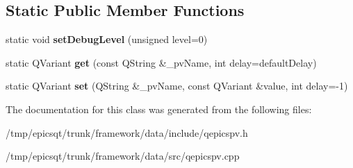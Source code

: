\subsection*{Static Public Member Functions}
\begin{DoxyCompactItemize}
\item 
\hypertarget{classQEpicsPV_af1bb5941b878ddc44b4fcb1c6b4466ff}{
static void {\bfseries setDebugLevel} (unsigned level=0)}
\label{classQEpicsPV_af1bb5941b878ddc44b4fcb1c6b4466ff}

\item 
\hypertarget{classQEpicsPV_a87c7e674fc5981adea30a32b86daec14}{
static QVariant {\bfseries get} (const QString \&\_\-pvName, int delay=defaultDelay)}
\label{classQEpicsPV_a87c7e674fc5981adea30a32b86daec14}

\item 
\hypertarget{classQEpicsPV_a704fcfcd602515d0d8ce678635b2e532}{
static QVariant {\bfseries set} (QString \&\_\-pvName, const QVariant \&value, int delay=-\/1)}
\label{classQEpicsPV_a704fcfcd602515d0d8ce678635b2e532}

\end{DoxyCompactItemize}


The documentation for this class was generated from the following files:\begin{DoxyCompactItemize}
\item 
/tmp/epicsqt/trunk/framework/data/include/qepicspv.h\item 
/tmp/epicsqt/trunk/framework/data/src/qepicspv.cpp\end{DoxyCompactItemize}
